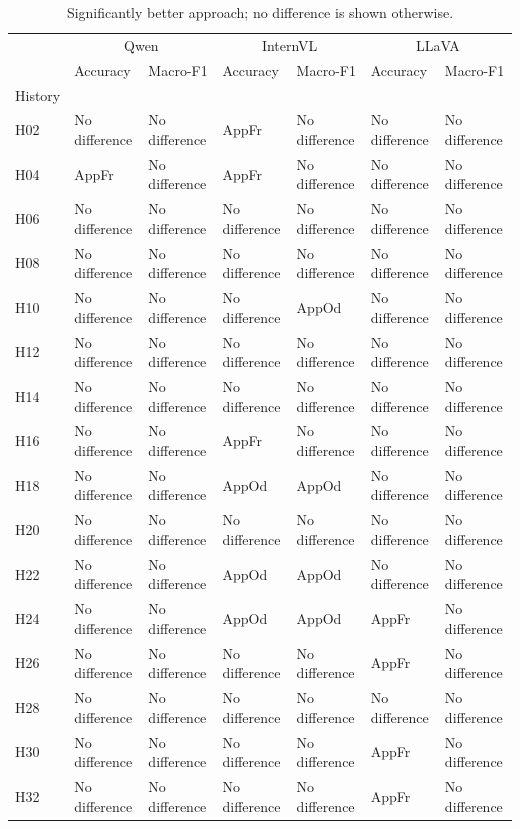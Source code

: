 \begin{table}[tbp]
\caption{Significantly better approach; no difference is shown otherwise.}
\label{tab:rq1a_significant_better_approach}
\begin{tabular}{lllllll}
\toprule
 & \multicolumn{2}{c}{Qwen} & \multicolumn{2}{c}{InternVL} & \multicolumn{2}{c}{LLaVA} \\
 & Accuracy & Macro-F1 & Accuracy & Macro-F1 & Accuracy & Macro-F1 \\
History &  &  &  &  &  &  \\
\midrule
H02 & No difference & No difference & AppFr & No difference & No difference & No difference \\
H04 & AppFr & No difference & AppFr & No difference & No difference & No difference \\
H06 & No difference & No difference & No difference & No difference & No difference & No difference \\
H08 & No difference & No difference & No difference & No difference & No difference & No difference \\
H10 & No difference & No difference & No difference & AppOd & No difference & No difference \\
H12 & No difference & No difference & No difference & No difference & No difference & No difference \\
H14 & No difference & No difference & No difference & No difference & No difference & No difference \\
H16 & No difference & No difference & AppFr & No difference & No difference & No difference \\
H18 & No difference & No difference & AppOd & AppOd & No difference & No difference \\
H20 & No difference & No difference & No difference & No difference & No difference & No difference \\
H22 & No difference & No difference & AppOd & AppOd & No difference & No difference \\
H24 & No difference & No difference & AppOd & AppOd & AppFr & No difference \\
H26 & No difference & No difference & No difference & No difference & AppFr & No difference \\
H28 & No difference & No difference & No difference & No difference & No difference & No difference \\
H30 & No difference & No difference & No difference & No difference & AppFr & No difference \\
H32 & No difference & No difference & No difference & No difference & AppFr & No difference \\
\bottomrule
\end{tabular}
\end{table}

